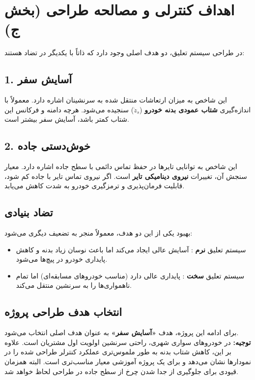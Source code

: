 \documentclass[a4paper]{article}
\begin{document}
	\section{اهداف کنترلی و مصالحه طراحی (بخش ج)}
	در طراحی سیستم تعلیق، دو هدف اصلی وجود دارد که ذاتاً با یکدیگر در تضاد هستند:
	
	\subsection{1. آسایش سفر }
	این شاخص به میزان ارتعاشات منتقل شده به سرنشینان اشاره دارد. معمولاً با اندازه‌گیری \textbf{شتاب عمودی بدنه خودرو} ($\ddot{z}_s$) سنجیده می‌شود. هرچه دامنه و فرکانس این شتاب کمتر باشد، آسایش سفر بیشتر است.
	
	\subsection{2. خوش‌دستی جاده }
	این شاخص به توانایی تایرها در حفظ تماس دائمی با سطح جاده اشاره دارد. معیار سنجش آن، تغییرات \textbf{نیروی دینامیکی تایر} است. اگر نیروی تماس تایر با جاده کم شود، قابلیت فرمان‌پذیری و ترمزگیری خودرو به شدت کاهش می‌یابد.
	
	\subsection{تضاد  بنیادی}
	بهبود یکی از این دو هدف، معمولاً منجر به تضعیف دیگری می‌شود:
	\begin{itemize}
		\item سیستم تعلیق \textbf{نرم} : آسایش عالی ایجاد می‌کند اما باعث نوسان زیاد بدنه و کاهش پایداری خودرو در پیچ‌ها می‌شود.
		\item سیستم تعلیق \textbf{سخت} : پایداری عالی دارد (مناسب خودروهای مسابقه‌ای) اما تمام ناهمواری‌ها را به سرنشین منتقل می‌کند.
\end{itemize}
	\subsection{انتخاب هدف طراحی پروژه}
	برای ادامه این پروژه، هدف \textbf{«آسایش سفر» } به عنوان هدف اصلی انتخاب می‌شود.
	\\
	\textbf{توجیه:} در خودروهای سواری شهری، راحتی سرنشین اولویت اول مشتریان است. علاوه بر این، کاهش شتاب بدنه به طور ملموس‌تری عملکرد کنترلر طراحی شده را در نمودارها نشان می‌دهد و برای یک پروژه آموزشی معیار مناسب‌تری است. البته همزمان قیودی برای جلوگیری از جدا شدن چرخ از سطح جاده  در طراحی لحاظ خواهد شد.
	
\end{document}
